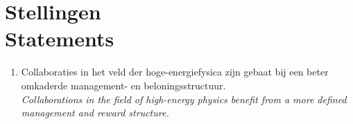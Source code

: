 \chapter*{Stellingen\\ Statements}

\begin{enumerate}

\item Collaboraties in het veld der hoge-energiefysica zijn gebaat bij een beter omkaderde management- en beloningsstructuur.\\
\emph{Collaborations in the field of high-energy physics benefit from a more defined management and reward structure.}

\end{enumerate}


